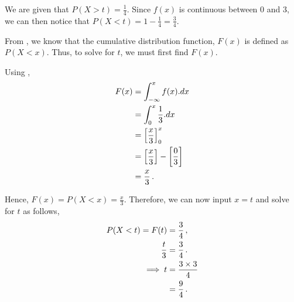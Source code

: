 \begin{subquestions}
\begin{subsubquestions}
\subsubquestion

We are given that $P(X>t) = \frac{1}{4}$. Since $f(x)$ is continuous between 0 and 3, we can then notice that $P(X<t)=1-\frac{1}{4}=\frac{3}{4}$.

From , we know that the cumulative distribution function, $F(x)$ is defined as $P(X<x)$. Thus, to solve for $t$, we must first find $F(x)$.

Using ,
\begin{align}
	F(x) & = \int_{-\infty}^{x} f(x).dx \nonumber \\
	     & = \int_{0}^{x} \frac{1}{3}.dx \nonumber \\
	     & = \left[\frac{x}{3} \right]_0^x \nonumber \\
	     & = \left[\frac{x}{3} \right] - \left[\frac{0}{3} \right] \nonumber \\
	     & = \frac{x}{3} \,.
\end{align}

Hence, $F(x)=P(X<x)=\frac{x}{3}$. Therefore, we can now input $x=t$ and solve for $t$ as follows,
\begin{align}
	P(X<t)=  F(t) & =\frac{3}{4}\,, \nonumber \\
	        \frac{t}{3} & = \frac{3}{4} \,. \nonumber \\
	        \implies  t & = \frac{3 \times 3}{4} \nonumber \\
	                    & = \frac{9}{4} \,.
\end{align}

\end{subsubquestions}

\end{subquestions}

